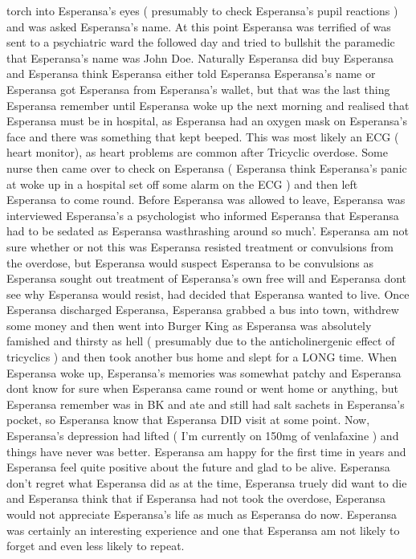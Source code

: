 \documentclass[12pt]{book}
\begin{document}
torch into Esperansa's eyes ( presumably to check Esperansa's pupil reactions ) and was asked Esperansa's name. At this point Esperansa was terrified of was sent to a psychiatric ward the followed day and tried to bullshit the paramedic that Esperansa's name was John Doe. Naturally Esperansa did buy Esperansa and Esperansa think Esperansa either told Esperansa Esperansa's name or Esperansa got Esperansa from Esperansa's wallet, but that was the last thing Esperansa remember until Esperansa woke up the next morning and realised that Esperansa must be in hospital, as Esperansa had an oxygen mask on Esperansa's face and there was something that kept beeped. This was most likely an ECG ( heart monitor), as heart problems are common after Tricyclic overdose. Some nurse then came over to check on Esperansa ( Esperansa think Esperansa's panic at woke up in a hospital set off some alarm on the ECG ) and then left Esperansa to come round. Before Esperansa was allowed to leave, Esperansa was interviewed Esperansa's a psychologist who informed Esperansa that Esperansa had to be sedated as Esperansa wasthrashing around so much'. Esperansa am not sure whether or not this was Esperansa resisted treatment or convulsions from the overdose, but Esperansa would suspect Esperansa to be convulsions as Esperansa sought out treatment of Esperansa's own free will and Esperansa dont see why Esperansa would resist, had decided that Esperansa wanted to live. Once Esperansa discharged Esperansa, Esperansa grabbed a bus into town, withdrew some money and then went into Burger King as Esperansa was absolutely famished and thirsty as hell ( presumably due to the anticholinergenic effect of tricyclics ) and then took another bus home and slept for a LONG time. When Esperansa woke up, Esperansa's memories was somewhat patchy and Esperansa dont know for sure when Esperansa came round or went home or anything, but Esperansa remember was in BK and ate and still had salt sachets in Esperansa's pocket, so Esperansa know that Esperansa DID visit at some point. Now, Esperansa's depression had lifted ( I'm currently on 150mg of venlafaxine ) and things have never was better. Esperansa am happy for the first time in years and Esperansa feel quite positive about the future and glad to be alive. Esperansa don't regret what Esperansa did as at the time, Esperansa truely did want to die and Esperansa think that if Esperansa had not took the overdose, Esperansa would not appreciate Esperansa's life as much as Esperansa do now. Esperansa was certainly an interesting experience and one that Esperansa am not likely to forget and even less likely to repeat.
\end{document}
